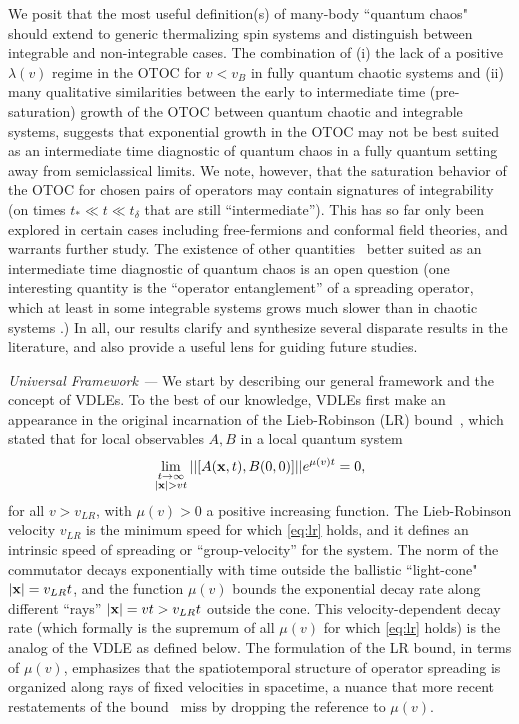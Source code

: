\documentclass[aps,prl,reprint,superscriptaddress, longbibliography]{revtex4-1}
\newcommand{\vb}{v_B}
\begin{document}
We posit that the most useful definition(s) of many-body ``quantum chaos" should extend to generic thermalizing spin systems and distinguish between integrable and non-integrable cases. The combination of (i) the lack of a positive $\lambda(v)$ regime in the OTOC for $v < \vb$  in fully quantum chaotic systems and (ii) many qualitative similarities between the early to intermediate time (pre-saturation) growth of the OTOC  between quantum chaotic and integrable systems, suggests that exponential growth in the OTOC may not be best suited as an intermediate time diagnostic of quantum chaos in a fully quantum setting away from semiclassical limits. We note, however, that the saturation behavior of the OTOC for chosen pairs of operators may contain signatures of integrability (on times $t_*\ll t \ll t_\delta$ that are still ``intermediate''). This has so far only been explored in certain cases including free-fermions\cite{MotrunichTFIM_otoc} and conformal field theories\cite{RobertsStanford, GuQi_rcft}, and warrants further study. 
The existence of other quantities~\cite{ProsenWeakChaos} better suited as an intermediate time diagnostic of quantum chaos is an open question (one interesting quantity is the ``operator entanglement'' of a spreading operator, which at least in some integrable systems \cite{prosen2007operator,pizorn2009operator,dubail2017entanglement} grows much slower than in chaotic systems \cite{LuitzScrambling, jonay}.)
In all, our results clarify and synthesize several disparate results in the literature, and also provide a useful lens for guiding future studies.  

\emph{Universal Framework ---} We start by describing our general framework and the concept of VDLEs. 
To the best of our knowledge,  VDLEs first make an appearance in the original incarnation of the Lieb-Robinson (LR) bound~\cite{Lieb72}, which stated that for local observables $A, B$ in a local quantum system
\begin{equation}
\lim_{\substack{  {t\rightarrow \infty}\\{ |{\bf x}|>vt}}} ||[A({\bf x},t), B(0,0)]||e^{\mu(v)t} =0,
\label{eq:lr} 
\end{equation}
for all $v> v_{LR}$, with $\mu(v)>0$ a positive increasing function.  The Lieb-Robinson velocity $v_{LR}$ is the minimum speed for which \eqref{eq:lr} holds, and it defines an intrinsic speed of spreading or ``group-velocity'' for the system.  The norm of the commutator decays exponentially with time outside the ballistic ``light-cone" $|{\bf x}| = v_{LR}t$, and the function $\mu(v)$ bounds the exponential decay rate along different ``rays'' $|{\bf x}| = vt > v_{LR}t $ outside the  cone. 
This velocity-dependent decay rate (which formally is the supremum of all $\mu(v)$ for which \eqref{eq:lr} holds) is the analog of the VDLE as defined below.
The formulation of the LR bound, in terms of $\mu(v)$, emphasizes that the spatiotemporal structure of  operator spreading is organized along rays of fixed velocities in spacetime, a nuance that more recent restatements of the bound~\cite{Nachtergaele1, Nachtergaele2, HastingsSpectralGap} miss by dropping the reference to $\mu(v)$. 
\end{document}
